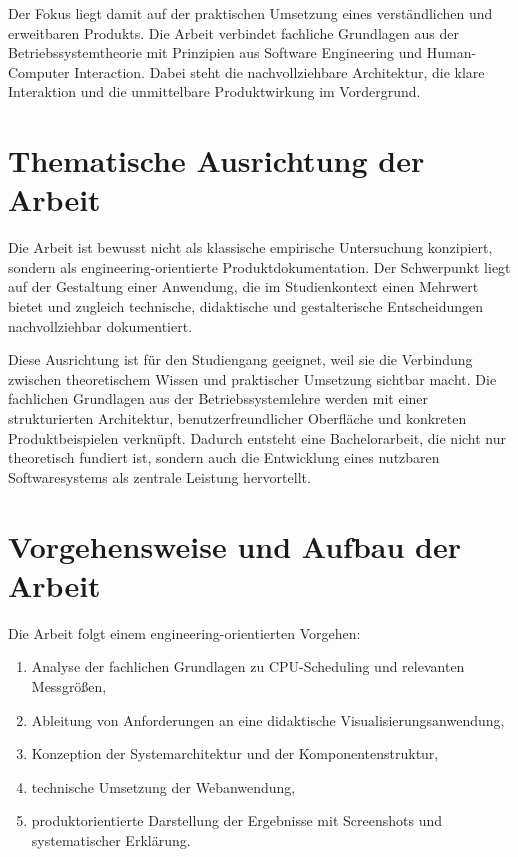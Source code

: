 Der Fokus liegt damit auf der praktischen Umsetzung eines verständlichen und erweitbaren Produkts. Die Arbeit verbindet fachliche Grundlagen aus der Betriebssystemtheorie mit Prinzipien aus Software Engineering und Human-Computer Interaction. Dabei steht die nachvollziehbare Architektur, die klare Interaktion und die unmittelbare Produktwirkung im Vordergrund.

\section{Thematische Ausrichtung der Arbeit}

Die Arbeit ist bewusst nicht als klassische empirische Untersuchung konzipiert, sondern als engineering-orientierte Produktdokumentation. Der Schwerpunkt liegt auf der Gestaltung einer Anwendung, die im Studienkontext einen Mehrwert bietet und zugleich technische, didaktische und gestalterische Entscheidungen nachvollziehbar dokumentiert.

Diese Ausrichtung ist für den Studiengang geeignet, weil sie die Verbindung zwischen theoretischem Wissen und praktischer Umsetzung sichtbar macht. Die fachlichen Grundlagen aus der Betriebssystemlehre werden mit einer strukturierten Architektur, benutzerfreundlicher Oberfläche und konkreten Produktbeispielen verknüpft. Dadurch entsteht eine Bachelorarbeit, die nicht nur theoretisch fundiert ist, sondern auch die Entwicklung eines nutzbaren Softwaresystems als zentrale Leistung hervortellt.

\section{Vorgehensweise und Aufbau der Arbeit}

Die Arbeit folgt einem engineering-orientierten Vorgehen:

\begin{enumerate}
    \item Analyse der fachlichen Grundlagen zu CPU-Scheduling und relevanten Messgrößen,
    \item Ableitung von Anforderungen an eine didaktische Visualisierungsanwendung,
    \item Konzeption der Systemarchitektur und der Komponentenstruktur,
    \item technische Umsetzung der Webanwendung,
    \item produktorientierte Darstellung der Ergebnisse mit Screenshots und systematischer Erklärung.
\end{enumerate}

